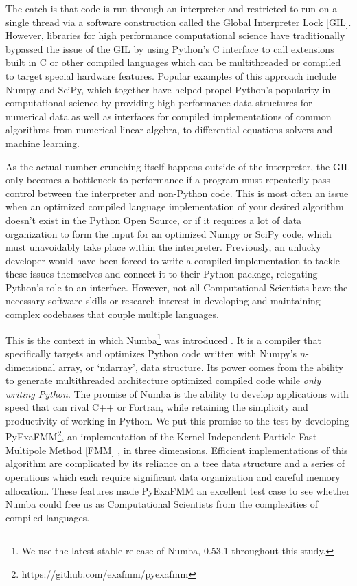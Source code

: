 \documentclass{IEEEcsmag}
\begin{document}
The catch is that code is run through an interpreter and restricted to run on a single thread via a software construction called the Global Interpreter Lock [GIL]. However, libraries for high performance computational science have traditionally bypassed the issue of the GIL by using Python's C interface to call extensions built in C or other compiled languages which can be multithreaded or compiled to target special hardware features. Popular examples of this approach include Numpy and SciPy, which together have helped propel Python's popularity in computational science by providing high performance data structures for numerical data as well as interfaces for compiled implementations of common algorithms from numerical linear algebra, to differential equations solvers and machine learning.

As the actual number-crunching itself happens outside of the interpreter, the GIL only becomes a bottleneck to performance if a program must repeatedly pass control between the interpreter and non-Python code. This is most often an issue when an optimized compiled language implementation of your desired algorithm doesn't exist in the Python Open Source, or if it requires a lot of data organization to form the input for an optimized Numpy or SciPy code, which must unavoidably take place within the interpreter. Previously, an unlucky developer would have been forced to write a compiled implementation to tackle these issues themselves and connect it to their Python package, relegating Python's role to an interface. However, not all Computational Scientists have the necessary software skills or research interest in developing and maintaining complex codebases that couple multiple languages.

This is the context in which Numba\footnote{We use the latest stable release of Numba, 0.53.1 throughout this study.} was introduced \cite{Lam2015}. It is a compiler that specifically targets and optimizes Python code written with Numpy's $n$-dimensional array, or `ndarray', data structure. Its power comes from the ability to generate multithreaded architecture optimized compiled code while \textit{only writing Python}. The promise of Numba is the ability to develop applications with speed that can rival C++ or Fortran, while retaining the simplicity and productivity of working in Python. We put this promise to the test by developing PyExaFMM\footnote{https://github.com/exafmm/pyexafmm}, an implementation of the Kernel-Independent Particle Fast Multipole Method [FMM] \cite{Ying2004,Greengard1987}, in three dimensions. Efficient implementations of this algorithm are complicated by its reliance on a tree data structure and a series of operations which each require significant data organization and careful memory allocation. These features made PyExaFMM an excellent test case to see whether Numba could free us as Computational Scientists from the complexities of compiled languages.
\end{document}
